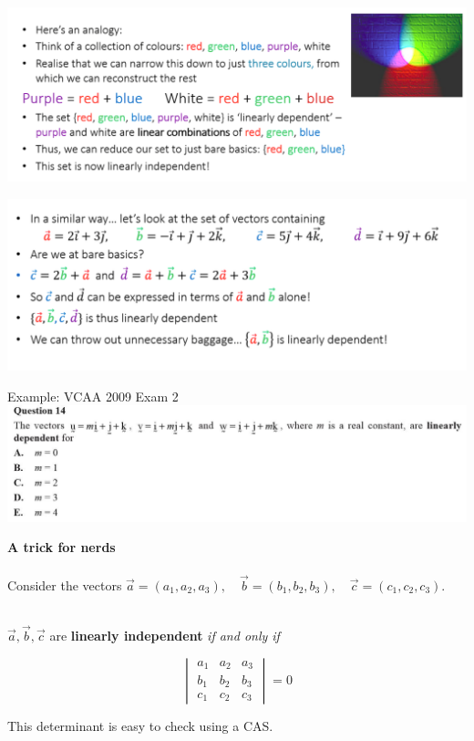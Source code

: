 \documentclass{beamer}
\begin{document}
\begin{frame}
	\includegraphics[width = \linewidth]{img/indep_1.png}
\end{frame}

\begin{frame}
	\includegraphics[width = \linewidth]{img/indep_2.png}
\end{frame}

\begin{frame}
	Example: VCAA 2009 Exam 2
	\includegraphics[width = \linewidth]{img/q1.png}
\end{frame}

\begin{frame}
	\textbf{A trick for nerds}\\~\\
	Consider the vectors $\vec{a} = (a_1, a_2, a_3),\quad\vec{b} = (b_1, b_2, b_3),\quad\vec{c} = (c_1, c_2, c_3)$.
	\\~\\
	\begin{center}$\vec{a}, \vec{b}, \vec{c}$ are \textbf{linearly independent} \textit{if and only if}\end{center}
	
	$$\begin{vmatrix}a_1&a_2&a_3\\b_1&b_2&b_3\\c_1&c_2&c_3
	\end{vmatrix} = 0$$
	
	This determinant is easy to check using a CAS.
\end{frame}
\end{document}
